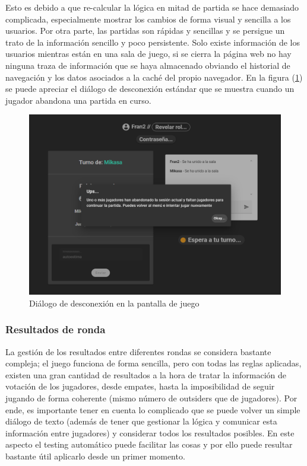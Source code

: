 Esto es debido a que re-calcular la lógica en mitad de partida se hace demasiado complicada, especialmente mostrar los cambios de forma visual y sencilla a los usuarios. Por otra parte, las partidas 
son rápidas y sencillas y se persigue un trato de la información sencillo y poco persistente. Solo existe información de los usuarios mientras están en una sala de juego, si se cierra la página 
web no hay ninguna traza de información que se haya almacenado obviando el historial de navegación y los datos asociados a la caché del propio navegador. En la figura (\ref{fig:res_desconexion}) 
se puede apreciar el diálogo de desconexión estándar que se muestra cuando un jugador abandona una partida en curso.

\begin{figure}[h]
	\centering
	\includegraphics[width=\textwidth,clip=true]{res_desconexion.png}
	\caption{Diálogo de desconexión en la pantalla de juego}
	\label{fig:res_desconexion}
\end{figure}


\subsubsection{Resultados de ronda}
\label{subsub:resultados_ronda}
La gestión de los resultados entre diferentes rondas se considera bastante compleja; el juego funciona de forma sencilla, pero con todas las reglas aplicadas,
existen una gran cantidad de resultados a la hora de tratar la información de votación de los jugadores, desde empates, hasta la imposibilidad de seguir jugando de forma coherente (mismo número de outsiders que de jugadores).
Por ende, es importante tener en cuenta lo complicado que se puede volver un simple diálogo de texto (además de tener 
que gestionar la lógica y comunicar esta información entre jugadores) y considerar todos los resultados posibles. En este aspecto el testing automático puede facilitar las
cosas y por ello puede resultar bastante útil aplicarlo desde un primer momento.

